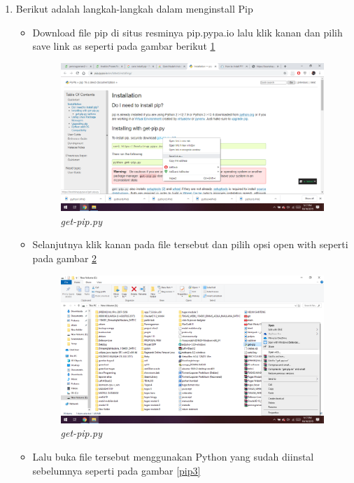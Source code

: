 \begin{enumerate}
    \item Berikut adalah langkah-langkah dalam menginstall Pip
    \begin{itemize}
        \item Download file pip di situs resminya pip.pypa.io lalu klik kanan dan pilih save link as seperti pada gambar berikut \ref{pip1}
    \begin{figure}[!htbp]
    \centering 
    \includegraphics[scale=0.25]{figures/pip1.png} 
    \caption{\textit{get-pip.py}}
    \label{pip1}
    \end{figure}
    \item Selanjutnya klik kanan pada file tersebut dan pilih opsi open with seperti pada gambar \ref{pip2}
    \begin{figure}[!htbp]
    \centering 
    \includegraphics[scale=0.25]{figures/pip2.png} 
    \caption{\textit{get-pip.py}}
    \label{pip2}
    \end{figure}
    \item Lalu buka file tersebut menggunakan Python yang sudah diinstal sebelumnya seperti pada gambar \ref{pip3}
        \begin{figure}[!htbp]

\end{figure}
\end{itemize}
\end{enumerate}
